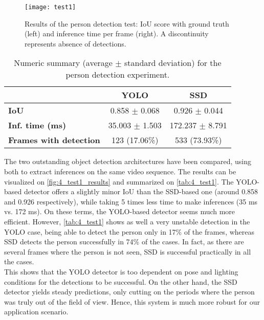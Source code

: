 \begin{figure}[h]
	\centering
	\texttt{[image: test1]}
	\caption{Results of the person detection test: IoU score with ground truth (left) and inference time per frame (right). A discontinuity represents absence of detections.}
	\label{fig:4_test1_results}
\end{figure}

\begin{table}[h]
	\begin{tabular}{|l|c|c|}
		\hline
		& \textbf{YOLO}             & \textbf{SSD}              \\ \hline
		\textbf{IoU}            & 0.858 $\pm$  0.068 & 0.926 $\pm$  0.044 \\ \hline
		\textbf{Inf. time (ms)} & 35.003 $\pm$ 1.503 & 172.237 $\pm$ 8.791 \\ \hline
		\textbf{Frames with detection} & 123 (17.06\%) & 533 (73.93\%) \\ \hline
	\end{tabular}
	\caption{Numeric summary (average $\pm$ standard deviation) for the person detection experiment.}
	\label{tab:4_test1}
\end{table}

The two outstanding object detection architectures have been compared, using both to extract inferences on the same video sequence. The results can be visualized on \autoref{fig:4_test1_results} and summarized on \autoref{tab:4_test1}. The YOLO-based detector offers a slightly minor IoU than the SSD-based one (around 0.858 and 0.926 respectively), while taking 5 times less time to make inferences (35 ms vs. 172 ms). On these terms, the YOLO-based detector seems much more efficient. However, \autoref{tab:4_test1} shows as well a very unstable detection in the YOLO case, being able to detect the person only in 17\% of the frames, whereas SSD detects the person successfully in 74\% of the cases. In fact, as there are several frames where the person is not seen, SSD is successful practically in all the cases.\\
This shows that the YOLO detector is too dependent on pose and lighting conditions for the detections to be successful. On the other hand, the SSD detector yields steady predictions, only cutting on the periods where the person was truly out of the field of view. Hence, this system is much more robust for our application scenario.\\

